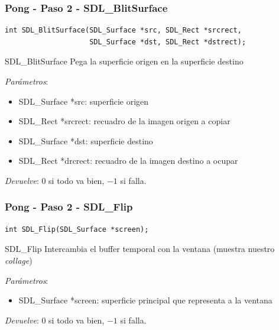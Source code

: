 \begin{frame}[fragile]
    \frametitle{Pong - Paso 2 - SDL\_BlitSurface}
	
\begin{verbatim}
int SDL_BlitSurface(SDL_Surface *src, SDL_Rect *srcrect,
                    SDL_Surface *dst, SDL_Rect *dstrect);
\end{verbatim}

    \begin{block}{SDL\_BlitSurface}
	Pega la superficie origen en la superficie destino
	
	\emph{Parámetros}:
	\begin{itemize}
	    \item SDL\_Surface *src: superficie origen
	    \item SDL\_Rect *srcrect: recuadro de la imagen origen a copiar
	    \item SDL\_Surface *dst: superficie destino
	    \item SDL\_Rect *drcrect: recuadro de la imagen destino a ocupar
	\end{itemize}
	
	\emph{Devuelve}: $0$ si todo va bien, $-1$ si falla.
    \end{block}

\end{frame}

\begin{frame}[fragile]
    \frametitle{Pong - Paso 2 - SDL\_Flip}
	
\begin{verbatim}
int SDL_Flip(SDL_Surface *screen);
\end{verbatim}

    \begin{block}{SDL\_Flip}
	Intercambia el buffer temporal con la ventana (muestra nuestro \emph{collage})
	
	\emph{Parámetros}:
	\begin{itemize}
	    \item SDL\_Surface *screen: superficie principal que representa a la ventana
	\end{itemize}
	
	\emph{Devuelve}: $0$ si todo va bien, $-1$ si falla.
    \end{block}

\end{frame}

